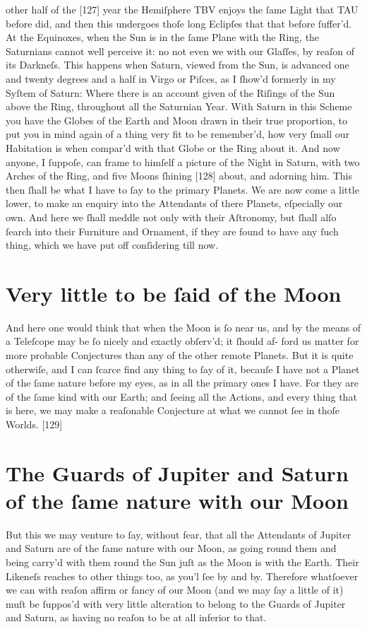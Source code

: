 \documentclass[letterpaper]{book}
\begin{document}
other half of the [127] year the Hemiſphere TBV enjoys the ſame Light that
TAU before did, and then this undergoes thoſe long Eclipſes that that before
ſuffer'd. At the Equinoxes, when the Sun is in the ſame Plane with the Ring,
the Saturnians cannot well perceive it: no not even we with our Glaſſes, by
reaſon of its Darkneſs. This happens when Saturn, viewed from the Sun, is
advanced one and twenty degrees and a half in Virgo or Piſces, as I ſhow'd
formerly in my Syſtem of Saturn: Where there is an account given of the
Riſings of the Sun above the Ring, throughout all the Saturnian Year.  With
Saturn in this Scheme you have the Globes of the Earth and Moon drawn in
their true proportion, to put you in mind again of a thing very fit to be
remember'd, how very ſmall our Habitation is when compar'd with that Globe
or the Ring about it. And now anyone, I ſuppoſe, can frame to himſelf a
picture of the Night in Saturn, with two Arches of the Ring, and five Moons
ſhining [128] about, and adorning him. This then ſhall be what I have to ſay
to the primary Planets.  We are now come a little lower, to make an enquiry
into the Attendants of there Planets, eſpecially our own. And here we ſhall
meddle not only with their Aſtronomy, but ſhall alſo ſearch into their
Furniture and Ornament, if they are found to have any ſuch thing, which we
have put off conſidering till now.


\section{Very little to be ſaid of the Moon}

And here one would think that when the Moon is ſo near us, and by the
means of a Teleſcope may be ſo nicely and exactly obſerv'd; it ſhould af-
ford us matter for more probable Conjectures than any of the other remote
Planets. But it is quite otherwiſe, and I can ſcarce find any thing to ſay
of it, becauſe I have not a Planet of the ſame nature before my eyes, as in
all the primary ones I have. For they are of the ſame kind with our Earth;
and ſeeing all the Actions, and every thing that is here, we may make a
reaſonable Conjecture at what we cannot ſee in thoſe Worlds.
[129]


\section{The Guards of Jupiter and Saturn of the ſame nature with our Moon}

But this we may venture to ſay, without fear, that all the Attendants of
Jupiter and Saturn are of the ſame nature with our Moon, as going round
them and being carry'd with them round the Sun juſt as the Moon is with
the Earth. Their Likeneſs reaches to other things too, as you'l ſee by and
by. Therefore whatſoever we can with reaſon affirm or fancy of our Moon
(and we may ſay a little of it) muſt be ſuppos'd with very little alteration
to belong to the Guards of Jupiter and Saturn, as having no reaſon to be
at all inferior to that.
\end{document}
